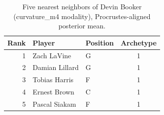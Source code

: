 \begin{table}[htbp]
  \centering\small
  \begin{tabular}{rllc}
    \toprule
    Rank & Player & Position & Archetype \\
    \midrule
    1 & Zach LaVine & G & 1 \\
    2 & Damian Lillard & G & 1 \\
    3 & Tobias Harris & F & 1 \\
    4 & Ernest Brown & C & 1 \\
    5 & Pascal Siakam & F & 1 \\
    \bottomrule
  \end{tabular}
  \caption{Five nearest neighbors of Devin Booker (curvature_m4 modality), Procrustes-aligned posterior mean.}
  \label{tab:Devin_Booker_neighbors_curvature_m4}
\end{table}

